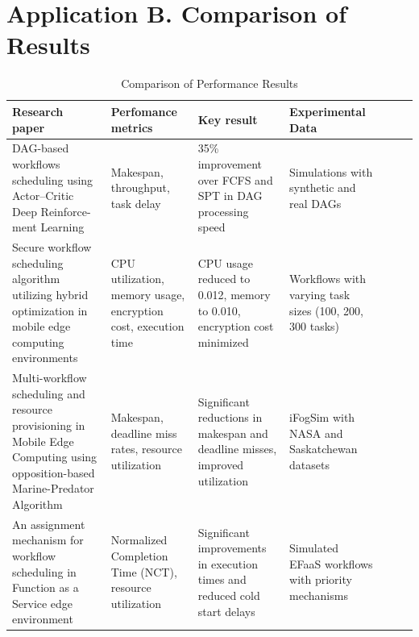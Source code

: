 \documentclass[a4paper, final]{article}
\begin{document}
\section* {Application B. Comparison of Results}
\hypertarget{ApplB}{}
\begin{table}[H]
    \centering
    \caption{Comparison of Performance Results}
    \label{tbl:2}
    \scriptsize
    \begin{tabularx}{\textwidth}{|p{3.5cm}|X|X|X|X|X|X|}
    \hline
    \textbf{Research paper} & \textbf{Perfomance metrics} & \textbf{Key result} & \textbf{Experimental Data} \\
    \hline

    DAG-based workflows scheduling using Actor–Critic Deep Reinforce-ment Learning \cite{bib:1_acrl} &
    Makespan, throughput, task delay &
    35\% improvement over FCFS and SPT in DAG processing speed &
    Simulations with synthetic and real DAGs \\
    \hline

    Secure workflow scheduling algorithm utilizing hybrid optimization in mobile edge computing environments \cite{bib:2_faro} &
    CPU utilization, memory usage, encryption cost, execution time &
    CPU usage reduced to 0.012, memory to 0.010, encryption cost minimized &
    Workflows with varying task sizes (100, 200, 300 tasks) \\
    \hline

    Multi-workflow scheduling and resource provisioning in Mobile Edge Computing using opposition-based Marine-Predator Algorithm \cite{bib:6_marine} &
    Makespan, deadline miss rates, resource utilization &
    Significant reductions in makespan and deadline misses, improved utilization &
    iFogSim with NASA and Saskatchewan datasets \\
    \hline

   
    An assignment mechanism for workflow scheduling in Function as a Service edge environment \cite{bib:4_faas} &
    Normalized Completion Time (NCT), resource utilization &
    Significant improvements in execution times and reduced cold start delays &
    Simulated EFaaS workflows with priority mechanisms \\
    \hline


\end{tabularx}
\end{table}
\end{document}
